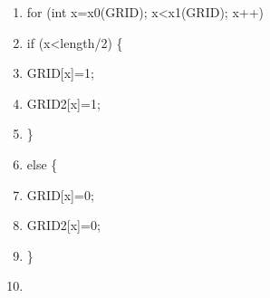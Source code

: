 \documentclass{article}
\begin{document}
\begin{shadebox}
\begin{enumerate}
\item for (int x=x0(GRID); x\textless x1(GRID); x++)
\item \hspace{10pt}        if (x\textless length/2) \{
\item \hspace{10pt} \hspace{10pt}                GRID[x]=1;
\item \hspace{10pt} \hspace{10pt}                GRID2[x]=1;
\item \hspace{10pt}        \}
\item \hspace{10pt}        else \{
\item \hspace{10pt} \hspace{10pt}               GRID[x]=0;
\item \hspace{10pt} \hspace{10pt}                GRID2[x]=0;
\item \hspace{10pt}        \}
\item 
\end{enumerate}
\end{shadebox}
\end{document}
